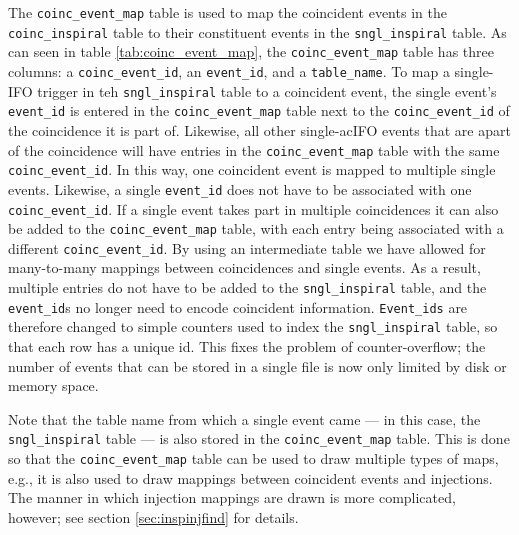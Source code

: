 The \texttt{coinc\_event\_map} table is used to map the coincident events in the \texttt{coinc\_inspiral} table to their constituent events in the \texttt{sngl\_inspiral} table. As can seen in table \ref{tab:coinc_event_map}, the \texttt{coinc\_event\_map} table has three columns: a \texttt{coinc\_event\_id}, an \texttt{event\_id}, and a \texttt{table\_name}. To map a single-\ac{IFO} trigger in teh \texttt{sngl\_inspiral} table to a coincident event, the single event's \texttt{event\_id} is entered in the \texttt{coinc\_event\_map} table next to the \texttt{coinc\_event\_id} of the coincidence it is part of. Likewise, all other single-ac{IFO} events that are apart of the coincidence will have entries in the \texttt{coinc\_event\_map} table with the same \texttt{coinc\_event\_id}. In this way, one coincident event is mapped to multiple single events. Likewise, a single \texttt{event\_id} does not have to be associated with one \texttt{coinc\_event\_id}. If a single event takes part in multiple coincidences it can also be added to the \texttt{coinc\_event\_map} table, with each entry being associated with a different \texttt{coinc\_event\_id}. By using an intermediate table we have allowed for many-to-many mappings between coincidences and single events. As a result, multiple entries do not have to be added to the \texttt{sngl\_inspiral} table, and the \texttt{event\_id}s no longer need to encode coincident information. \texttt{Event\_ids} are therefore changed to simple counters used to index the \texttt{sngl\_inspiral} table, so that each row has a unique id. This fixes the problem of counter-overflow; the number of events that can be stored in a single file is now only limited by disk or memory space.

Note that the table name from which a single event came --- in this case, the \texttt{sngl\_inspiral} table --- is also stored in the \texttt{coinc\_event\_map} table. This is done so that the \texttt{coinc\_event\_map} table can be used to draw multiple types of maps, e.g., it is also used to draw mappings between coincident events and injections. The manner in which injection mappings are drawn is more complicated, however; see section \ref{sec:inspinjfind} for details.

